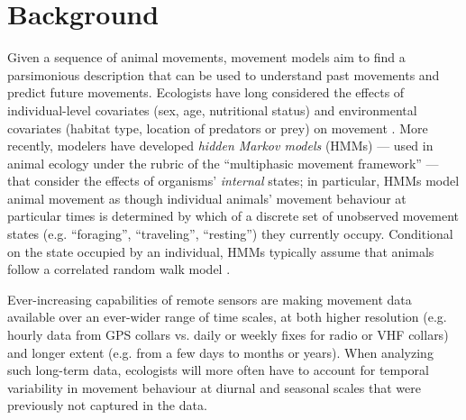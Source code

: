 \documentclass{bmcart}
\begin{document}


\doublespacing

\section*{Background}

Given a sequence of animal movements, movement models aim to find a parsimonious description
that can be used to understand past movements and predict
future movements. Ecologists have long considered the effects of
individual-level covariates (sex, age, nutritional status) and
environmental covariates (habitat type, location of predators or prey)
on movement \cite{patterson2008state, mckenzie2009first, pal1998dispersal}. 
More recently, modelers have developed
\emph{hidden Markov models} (HMMs)
\cite{firle_influence_1998,nathan_movement_2008,langrock_flexible_2012} %
--- used in animal ecology under the rubric of the ``multiphasic movement
framework'' \cite{fryxell_multiple_2008} --- that consider the effects
of organisms' \emph{internal} states; in particular, HMMs model animal
movement as though individual animals' movement behaviour 
at particular times is determined
by which of a discrete set of unobserved movement states
(e.g. ``foraging'', ``traveling'', ``resting'') they currently occupy.
Conditional on the state occupied by an individual, HMMs typically
assume that animals follow a correlated random walk model
\cite{okubo_diffusion_1980,turchin1998quantitative}.


Ever-increasing capabilities of remote
sensors are making movement data available over an
ever-wider range of time scales, at both higher resolution (e.g. hourly data
from GPS collars vs. daily or weekly fixes for radio or VHF
collars) and longer extent (e.g. from a few days to months or years).  When analyzing such
long-term data, ecologists will more
often have to account for temporal variability in movement
behaviour at diurnal and seasonal scales that were previously
not captured in the data.
\end{document}
